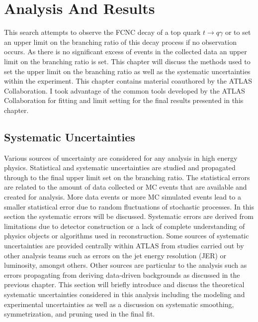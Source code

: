 
\chapter{Analysis And Results}
\label{ch:Results}
This search attempts to observe the FCNC decay of a top quark $t \rightarrow q \gamma$ or to set an upper limit on the branching ratio of this decay process if no observation occurs.  As there is no significant excess of events in the collected data an upper limit on the branching ratio is set.  This chapter will discuss  the methods used to set the upper limit on the branching ratio as well as the systematic uncertainties within the experiment.   This chapter contains material coauthored by the ATLAS Collaboration.  I took advantage of the common tools developed by the ATLAS Collaboration for fitting and limit setting for the final results presented in this chapter.

\section{Systematic Uncertainties}
\label{sec:NPUncertainties}
Various sources of uncertainty are considered for any analysis in high energy physics.  Statistical and systematic uncertainties are studied and propagated through to the final upper limit set on the branching ratio.  The statistical errors are related to the amount of data collected or MC events that are available and created for analysis.  More data events or more MC simulated events lead to a smaller statistical error due to random fluctuations of stochastic processes.  In this section the systematic errors will be discussed.  Systematic errors are derived from limitations due to detector construction or a lack of complete understanding of physics objects or algorithms used in reconstruction.  Some sources of systematic uncertainties are provided centrally within ATLAS from studies carried out by other analysis teams such as errors on the jet energy resolution (JER) or luminosity, amongst others. Other sources are particular to the analysis such as errors propagating from deriving data-driven backgrounds as discussed in the previous chapter.
This section will briefly introduce and discuss the theoretical systematic uncertainties considered in this analysis including the modeling and experimental uncertainties as well as a discussion on systematic smoothing, symmetrization, and pruning used in the final fit. 

